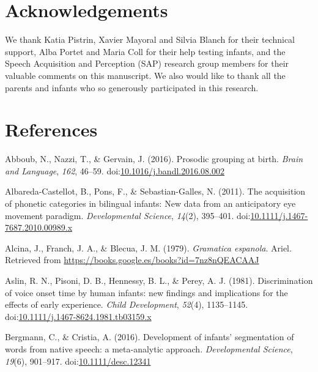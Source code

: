 \documentclass[man,floatsintext]{apa6}
\begin{document}
\hypertarget{acknowledgements}{%
\section{Acknowledgements}\label{acknowledgements}}

We thank Katia Pistrin, Xavier Mayoral and Silvia Blanch for their technical support, Alba Portet and Maria Coll for their help testing infants, and the Speech Acquisition and Perception (SAP) research group members for their valuable comments on this manuscript. We also would like to thank all the parents and infants who so generously participated in this research.

\hypertarget{references}{%
\section{References}\label{references}}

\begingroup
\setlength{\parindent}{-0.5in}
\setlength{\leftskip}{0.5in}

\hypertarget{refs}{}
\leavevmode\hypertarget{ref-abboub2016}{}%
Abboub, N., Nazzi, T., \& Gervain, J. (2016). Prosodic grouping at birth. \emph{Brain and Language}, \emph{162}, 46--59. doi:\href{https://doi.org/10.1016/j.bandl.2016.08.002}{10.1016/j.bandl.2016.08.002}

\leavevmode\hypertarget{ref-albaredacastellot2011}{}%
Albareda-Castellot, B., Pons, F., \& Sebastian-Galles, N. (2011). The acquisition of phonetic categories in bilingual infants: New data from an anticipatory eye movement paradigm. \emph{Developmental Science}, \emph{14}(2), 395--401. doi:\href{https://doi.org/10.1111/j.1467-7687.2010.00989.x}{10.1111/j.1467-7687.2010.00989.x}

\leavevmode\hypertarget{ref-alcina1979}{}%
Alcina, J., Franch, J. A., \& Blecua, J. M. (1979). \emph{Gramatica espanola}. Ariel. Retrieved from \url{https://books.google.es/books?id=7nz8nQEACAAJ}

\leavevmode\hypertarget{ref-aslin1981}{}%
Aslin, R. N., Pisoni, D. B., Hennessy, B. L., \& Perey, A. J. (1981). Discrimination of voice onset time by human infants: new findings and implications for the effects of early experience. \emph{Child Development}, \emph{52}(4), 1135--1145. doi:\href{https://doi.org/10.1111/j.1467-8624.1981.tb03159.x}{10.1111/j.1467-8624.1981.tb03159.x}

\leavevmode\hypertarget{ref-bergmann2016}{}%
Bergmann, C., \& Cristia, A. (2016). Development of infants' segmentation of words from native speech: a meta-analytic approach. \emph{Developmental Science}, \emph{19}(6), 901--917. doi:\href{https://doi.org/10.1111/desc.12341}{10.1111/desc.12341}
\end{document}
